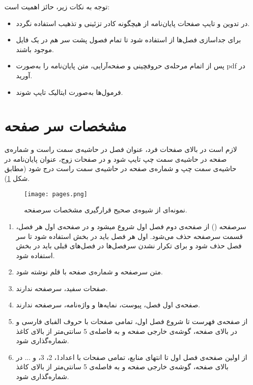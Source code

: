 		\begin{remark}
			توجه به نکات زیر، حائز اهمیت است:
			\begin{itemize}
				\item در تدوین‌ و تایپ‌ صفحات‌ پایان‌نامه‌ از هیچگونه‌ كادر تزئینی‌ و تذهیب‌ استفاده‌ نگردد.
				\item برای جداسازی فصل‌ها از  استفاده شود تا تمام فصول پشت سر هم در یک فایل موجود باشند. 
				\item پس از اتمام مرحله‌ی حروفچینی و صفحه‌آرایی، متن پایان‌نامه را به‌صورت \gls{pdf} در آورید.
				\item فرمول‌ها به‌صورت ایتالیک تایپ شوند.
			\end{itemize}
		\end{remark}

	\section{مشخصات سر صفحه}
			لازم است در بالای صفحات فرد، عنوان فصل در حاشیه‌ی سمت راست و شماره‌ی صفحه در حاشیه‌ی سمت چپ تایپ شود و در صفحات زوج، عنوان پایان‌نامه در حاشیه‌ی سمت چپ و شماره‌ی صفحه در حاشیه‌ی سمت راست درج شود (مطابق شکل \ref{fig:header}). 
	\begin{figure}
	\centering
	\texttt{[image: pages.png]}
\caption{نمونه‌ای از شیوه‌ی صحیح قرارگیری مشخصات سرصفحه.}
\label{fig:header}
\end{figure}
			\begin{enumerate}[label=\Alph*:]
				\item سرصفحه () از صفحه‌ی دوم فصل اول شروع میشود و در صفحه‌ی اول هر فصل، قسمت سرصفحه حذف می‌شود. اول هر فصل باید  در بخش  استفاده شود تا سر فصل حذف شود و برای تکرار نشدن سرفصل‌ها در فصل‌های قبلی باید  در بخش  استفاده شود.
				\item متن سرصفحه و شماره‌ی صفحه با قلم   نوشته شود. 
				\item صفحات سفید، سرصفحه ندارند. 
				\item صفحه‌ی اول فصل، پیوست، نمایه‌ها و واژه‌نامه، سرصفحه ندارند. 
				\item از صفحه‌ی فهرست تا شروع فصل اول، تمامی صفحات با حروف الفبای فارسی و در بالای صفحه، گوشه‌ی خارجی صفحه و به فاصله‌ی 5 سانتی‌متر از بالای كاغذ شماره‌گذاری ‌شود.
				\item از اولین صفحه‌ی فصل اول تا انتهای منابع، تمامی صفحات با اعداد1، 2، 3، و ... در بالای صفحه، گوشه‌ی خارجی صفحه و به فاصله‌ی 5 سانتی‌متر از بالای كاغذ شماره‌گذاری ‌شود.
			\end{enumerate}
			
